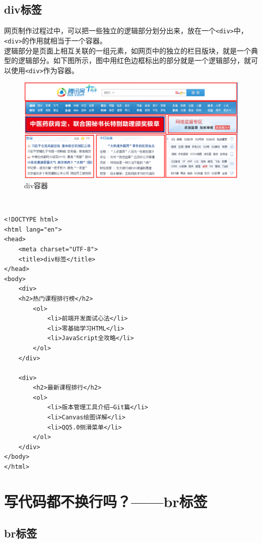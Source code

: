 \subsection{div标签}

网页制作过程过中，可以把一些独立的逻辑部分划分出来，放在一个\lstinline|<div>|中，\lstinline|<div>|的作用就相当于一个容器。 \\

逻辑部分是页面上相互关联的一组元素，如网页中的独立的栏目版块，就是一个典型的逻辑部分。如下图所示，图中用红色边框标出的部分就是一个逻辑部分，就可以使用\lstinline|<div>|作为容器。 \\

\begin{figure}[H]
    \centering
    \includegraphics[scale=0.5]{img/C2/2-3/1.png}
    \caption{div容器}
\end{figure}

 \\
\begin{lstlisting}[style=htmlcssjs]
<!DOCTYPE html>
<html lang="en">
<head>
    <meta charset="UTF-8">
    <title>div标签</title>
</head>
<body>
    <div>
    <h2>热门课程排行榜</h2>
        <ol>
            <li>前端开发面试心法</li>
            <li>零基础学习HTML</li>
            <li>JavaScript全攻略</li>
        </ol>
    </div>

    <div>
        <h2>最新课程排行</h2>
        <ol>
            <li>版本管理工具介绍—Git篇</li>
            <li>Canvas绘图详解</li>
            <li>QQ5.0侧滑菜单</li>
        </ol>
    </div>
</body>
</html>
\end{lstlisting}

\newpage

\section{写代码都不换行吗？——br标签}

\subsection{br标签}

